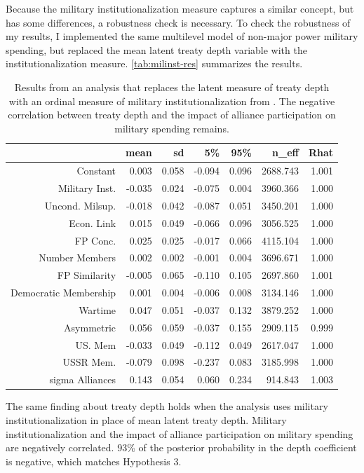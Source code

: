 \documentclass[12pt]{article}
\begin{document}
Because the military institutionalization measure captures a similar concept, but has some differences, a robustness check is necessary. 
To check the robustness of my results, I implemented the same multilevel model of non-major power military spending, but replaced the mean latent treaty depth variable with the institutionalization measure. 
\autoref{tab:milinst-res} summarizes the results. 


\begin{table}[ht]
\centering
\begin{tabular}{rrrrrrr}
  \hline
 & mean & sd & 5\% & 95\% & n\_eff & Rhat \\ 
  \hline
Constant & 0.003 & 0.058 & -0.094 & 0.096 & 2688.743 & 1.001 \\ 
  Military Inst. & -0.035 & 0.024 & -0.075 & 0.004 & 3960.366 & 1.000 \\ 
  Uncond. Milsup. & -0.018 & 0.042 & -0.087 & 0.051 & 3450.201 & 1.000 \\ 
  Econ. Link & 0.015 & 0.049 & -0.066 & 0.096 & 3056.525 & 1.000 \\ 
  FP Conc. & 0.025 & 0.025 & -0.017 & 0.066 & 4115.104 & 1.000 \\ 
  Number Members & 0.002 & 0.002 & -0.001 & 0.004 & 3696.671 & 1.000 \\ 
  FP Similarity & -0.005 & 0.065 & -0.110 & 0.105 & 2697.860 & 1.001 \\ 
  Democratic Membership & 0.001 & 0.004 & -0.006 & 0.008 & 3134.146 & 1.000 \\ 
  Wartime & 0.047 & 0.051 & -0.037 & 0.132 & 3879.252 & 1.000 \\ 
  Asymmetric & 0.056 & 0.059 & -0.037 & 0.155 & 2909.115 & 0.999 \\ 
  US. Mem & -0.033 & 0.049 & -0.112 & 0.049 & 2617.047 & 1.000 \\ 
  USSR Mem. & -0.079 & 0.098 & -0.237 & 0.083 & 3185.998 & 1.000 \\ 
  sigma Alliances & 0.143 & 0.054 & 0.060 & 0.234 & 914.843 & 1.003 \\ 
   \hline
\end{tabular}
\caption{Results from an analysis that replaces the latent measure of treaty depth with an ordinal measure of military institutionalization from \citet{LeedsAnac2005}. The negative correlation between treaty depth and the impact of alliance participation on military spending remains.}
\label{tab:milinst-res}
\end{table}


The same finding about treaty depth holds when the analysis uses military institutionalization in place of mean latent treaty depth. 
Military institutionalization and the impact of alliance participation on military spending are negatively correlated. 
93\% of the posterior probability in the depth coefficient is negative, which matches Hypothesis 3. 
\end{document}
